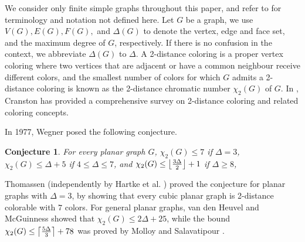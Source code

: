 \documentclass[12pt, reqno]{amsart}
\DeclarePairedDelimiter{\ceil}{\lceil}{\rceil}
\DeclarePairedDelimiter\floor{\lfloor}{\rfloor}
\theoremstyle{plain}
\newtheorem{conjecture}[equation]{Conjecture}
\theoremstyle{definition}
\numberwithin{equation}{section}
\newcommand{\D}{\Delta}
\begin{document}
We consider only finite simple graphs throughout this paper, and refer to \cite{west} for terminology and notation not defined here. Let $G$ be a graph, we use $V(G),E(G),F(G),$ and $\D(G)$ to denote the vertex, edge and face set, and the maximum degree of $G$, respectively. If there is no confusion in the context, we abbreviate $\D(G)$ to $\D$. 
A 2-distance coloring is a proper vertex coloring where two vertices that are adjacent or have a common neighbour receive different colors, and the smallest number of colors for which $G$ admits a 2-distance coloring is known as the 2-distance chromatic number $\chi_2(G)$ of $G$. 
In \cite{daniel}, Cranston has provided a comprehensive survey on 2-distance coloring and related coloring concepts.

In 1977, Wegner \cite{wegner} posed the following conjecture.

\begin{conjecture}\label{conj:main}
For every planar graph $G$, $\chi_2(G) \leq 7$ if $\Delta=3$, $\chi_2(G) \leq \Delta+5$ if $4\leq \Delta\leq 7$, and $\chi_2(G) \leq  \floor[\big]{\frac{3\Delta}{2}}+1$ if $\Delta\geq 8$, 
\end{conjecture}

Thomassen \cite{thomassen} (independently by Hartke et al. \cite{hartke}) proved the conjecture for planar graphs with $\Delta = 3$, by showing that every cubic planar graph is 2-distance colorable with $7$ colors. For general planar graphs,  van den Heuvel and McGuinness \cite{van-den} showed that $\chi_2(G) \leq 2\Delta + 25$, while the bound $\chi_2(G) \leq \ceil[\big]{ \frac{5\D}{3}}+78$ was proved by Molloy and Salavatipour \cite{molloy}.\medskip





\end{document}
